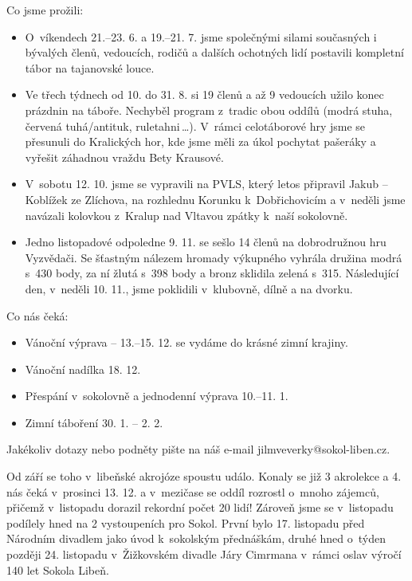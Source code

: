 \documentclass[11pt]{article}
\begin{document}
\vspace*{\baselineskip}
\noindent
Co jsme prožili:
\begin{itemize}[
  itemsep=-3pt,
  leftmargin=1em,
  itemindent=-1em
]
  \item[] O~víkendech 21.–⁠⁠⁠⁠⁠⁠23. 6. a 19.–⁠⁠⁠⁠⁠⁠21. 7. jsme společnými silami současných i bývalých členů, vedoucích, rodičů a dalších ochotných lidí postavili kompletní tábor na tajanovské louce.
  \item[] Ve třech týdnech od 10. do 31. 8. si 19 členů a až 9 vedoucích užilo konec prázdnin na táboře. Nechyběl program z~tradic obou oddílů (modrá stuha, červená tuhá/antituk, ruletahni\,\ldots{}). V~rámci celotáborové hry jsme se přesunuli do Kralických hor, kde jsme měli za úkol pochytat pašeráky a vyřešit záhadnou vraždu Bety Krausové.
  \item[] V~sobotu 12. 10. jsme se vypravili na PVLS, který letos připravil Jakub –⁠⁠⁠⁠⁠⁠ Koblížek ze Zlíchova, na rozhlednu Korunku k~Dobřichovicím a v~neděli jsme navázali kolovkou z~Kralup nad Vltavou zpátky k~naší sokolovně.
  \item[] Jedno listopadové odpoledne 9. 11. se sešlo 14 členů na dobrodružnou hru Vyzvědači. Se šťastným nálezem hromady výkupného vyhrála družina modrá s~430 body, za ní žlutá s~398 body a bronz sklidila zelená s~315. Následující den, v~neděli 10. 11., jsme poklidili v~klubovně, dílně a na dvorku.
\end{itemize}

\vspace*{\baselineskip}
\noindent
Co nás čeká:
\begin{itemize}[
  itemsep=-3pt,
  leftmargin=1em,
  itemindent=-1em
]
  \item[] Vánoční výprava –⁠⁠⁠⁠⁠⁠ 13.–⁠⁠⁠⁠⁠⁠15. 12. se vydáme do krásné zimní krajiny.
  \item[] Vánoční nadílka 18. 12.
  \item[] Přespání v~sokolovně a jednodenní výprava 10.–⁠⁠⁠⁠⁠⁠11. 1.
  \item[] Zimní táboření 30. 1. –⁠⁠⁠⁠⁠⁠ 2. 2.
\end{itemize}

\noindent
Jakékoliv dotazy nebo podněty pište na náš e-mail jilmveverky@sokol-liben.cz.

\signature{Bára}{}

Od září se toho v~libeňské akrojóze spoustu událo. Konaly se již 3 akrolekce a 4. nás čeká v~prosinci 13. 12. a v~mezičase se oddíl rozrostl o~mnoho zájemců, přičemž v~listopadu dorazil rekordní počet 20 lidí! Zároveň jsme se v~listopadu podílely hned na 2 vystoupeních pro Sokol. První bylo 17. listopadu před Národním divadlem jako úvod k~sokolským přednáškám, druhé hned o~týden později 24. listopadu v~Žižkovském divadle Járy Cimrmana v~rámci oslav výročí 140 let Sokola Libeň.
\end{document}
